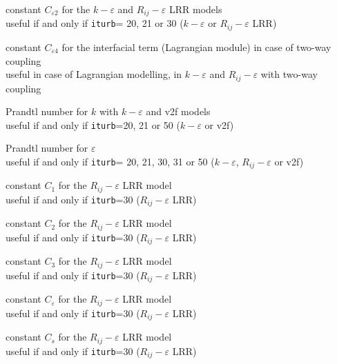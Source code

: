 {constant $C_{\varepsilon 2}$ for the $k-\varepsilon$ and
$R_{ij}-\varepsilon$ LRR models\\
useful if and only if {\tt iturb}= 20, 21 or 30
($k-\varepsilon$ or $R_{ij}-\varepsilon$ LRR)}


{constant $C_{\varepsilon 4}$ for the interfacial term (Lagrangian module) in
case of two-way coupling\\
useful in case of Lagrangian modelling, in $k-\varepsilon$ and $R_{ij}-\varepsilon$
with two-way coupling}

{Prandtl number for $k$ with $k-\varepsilon$ and v2f models\\
useful if and only if {\tt iturb}=20, 21 or 50
($k-\varepsilon$ or v2f)}

{Prandtl number for $\varepsilon$\\
useful if and only if {\tt iturb}= 20,
21, 30, 31 or 50 ($k-\varepsilon$, $R_{ij}-\varepsilon$ or v2f)}


{constant $C_1$ for the $R_{ij}-\varepsilon$ LRR model\\
useful if and only if {\tt iturb}=30
($R_{ij}-\varepsilon$ LRR)}

{constant $C_2$ for the $R_{ij}-\varepsilon$ LRR model\\
useful if and only if {\tt iturb}=30
($R_{ij}-\varepsilon$ LRR)}

{constant $C_3$ for the $R_{ij}-\varepsilon$ LRR model\\
useful if and only if {\tt iturb}=30
($R_{ij}-\varepsilon$ LRR)}

{constant $C_\varepsilon$ for the $R_{ij}-\varepsilon$ LRR model\\
useful if and only if {\tt iturb}=30
($R_{ij}-\varepsilon$ LRR)}

{constant $C_s$ for the $R_{ij}-\varepsilon$ LRR model\\
useful if and only if {\tt iturb}=30
($R_{ij}-\varepsilon$ LRR)}

